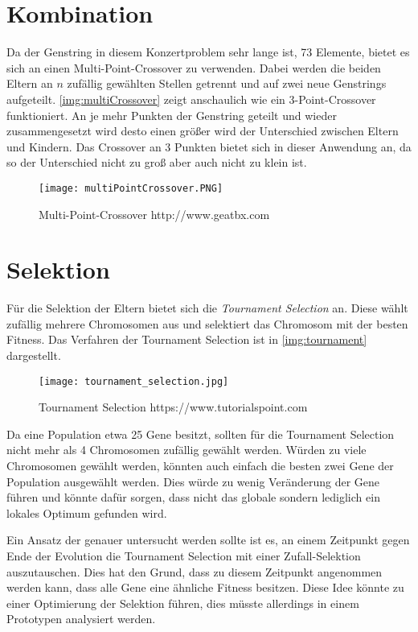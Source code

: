 \section{Kombination}\label{sec:eltern}
Da der Genstring in diesem Konzertproblem sehr lange ist, 73 Elemente, bietet es sich an einen Multi-Point-Crossover zu verwenden.
Dabei werden die beiden Eltern an $n$ zufällig gewählten Stellen getrennt und auf zwei neue Genstrings aufgeteilt.
\autoref{img:multiCrossover} zeigt anschaulich wie ein 3-Point-Crossover funktioniert. An je mehr Punkten
der Genstring geteilt und wieder zusammengesetzt wird desto einen größer wird der Unterschied zwischen Eltern und Kindern.
Das Crossover an 3 Punkten bietet sich in dieser Anwendung an, da so der Unterschied nicht zu groß aber auch nicht zu klein ist.

\begin{figure}[h]
    \begin{minipage}{\textwidth}
	    \centering
        \texttt{[image: multiPointCrossover.PNG]}
	    \caption{Multi-Point-Crossover {http://www.geatbx.com}}
        \label{img:multiCrossover}
    \end{minipage}
\end{figure}

\section{Selektion}
Für die Selektion der Eltern bietet sich die \emph{Tournament Selection} an.
Diese wählt zufällig mehrere Chromosomen aus und selektiert das Chromosom mit der besten Fitness. Das Verfahren der
Tournament Selection ist in \autoref{img:tournament} dargestellt.


\begin{figure}
    \begin{minipage}{\textwidth}
        \texttt{[image: tournament\_selection.jpg]}
        \caption{Tournament Selection {https://www.tutorialspoint.com}}
        \label{img:tournament}
    \end{minipage}
\end{figure}

Da eine Population etwa 25 Gene besitzt, sollten für die Tournament Selection nicht mehr als 4 Chromosomen zufällig gewählt werden.
Würden zu viele Chromosomen gewählt werden, könnten auch einfach die besten zwei Gene der Population ausgewählt werden.
Dies würde zu wenig Veränderung der Gene führen und könnte dafür sorgen, dass nicht das globale sondern
lediglich ein lokales Optimum gefunden wird.

Ein Ansatz der genauer untersucht werden sollte ist es, an einem Zeitpunkt gegen Ende der
Evolution die Tournament Selection mit einer Zufall-Selektion auszutauschen.
Dies hat den Grund, dass zu diesem Zeitpunkt angenommen werden kann, dass alle
Gene eine ähnliche Fitness besitzen. Diese Idee könnte zu einer Optimierung der Selektion führen, dies 
müsste allerdings in einem Prototypen analysiert werden. 